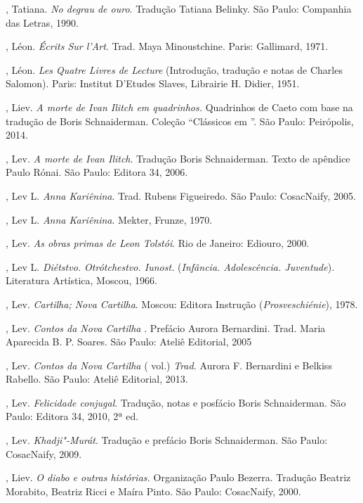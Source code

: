 \begin{Parskip}
, Tatiana. \emph{No degrau de ouro}. Tradução Tatiana Belinky. São Paulo: Companhia das Letras, 1990.

, Léon. \emph{Écrits Sur l'Art}. Trad. Maya Minoustchine. Paris:
Gallimard, 1971.

, Léon. \emph{Les Quatre Livres de Lecture} (Introdução,
tradução e notas de Charles Salomon). Paris: Institut D'Etudes Slaves,
Librairie H. Didier, 1951.

, Liev. \emph{A morte de Ivan Ilitch em quadrinhos.} Quadrinhos de Caeto com base na
tradução de Boris Schnaiderman. Coleção ``Clássicos em ''. São Paulo: Peirópolis, 2014.

, Lev. \emph{A morte de Ivan Ilitch}. Tradução Boris Schnaiderman. Texto de apêndice
Paulo Rónai. São Paulo: Editora 34, 2006.

, Lev L. \emph{Anna Kariênina}. Trad. Rubens Figueiredo. São
Paulo: CosacNaify, 2005.

, Lev L. \emph{Anna Kariênina}. Mekter, Frunze, 1970.

, Lev. \emph{As obras primas de Leon Tolstói}. Rio de Janeiro:
Ediouro, 2000.

, Lev L. \emph{Diétstvo. Otrótchestvo.
Iunost.} (\emph{Infância. Adolescência. Juventude}). Literatura
Artística, Moscou, 1966.

, Lev. \emph{Cartilha; Nova Cartilha}. Moscou: Editora Instrução (\emph{Prosveschiénie}), 1978.

, Lev. \emph{Contos da Nova Cartilha }. Prefácio Aurora
Bernardini. Trad. Maria Aparecida B. P. Soares. São Paulo: Ateliê
Editorial, 2005

, Lev. \emph{Contos da Nova Cartilha } ( vol.) \emph{Trad.}
Aurora F. Bernardini e Belkiss Rabello. São Paulo: Ateliê Editorial,
2013.

, Lev. \emph{Felicidade conjugal}. Tradução, notas e posfácio Boris Schnaiderman. São
Paulo: Editora 34, 2010, 2ª ed.

, Lev. \emph{Khadji"-Murát}. Tradução e prefácio Boris Schnaiderman. São Paulo: CosacNaify, 2009.

, Liev. \emph{O diabo e outras histórias.} Organização Paulo Bezerra. Tradução Beatriz
Morabito, Beatriz Ricci e Maíra Pinto. São Paulo: CosacNaify, 2000.


\end{Parskip}
